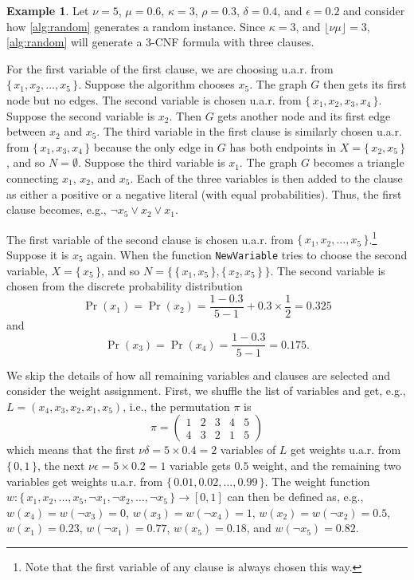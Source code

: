 \documentclass{article}
\theoremstyle{definition}
\newtheorem{example}{Example}
\theoremstyle{remark}
\begin{document}
\begin{example} \label{example:algorithm}
  Let $\nu = 5$, $\mu = 0.6$, $\kappa = 3$, $\rho = 0.3$, $\delta = 0.4$,
  and $\epsilon = 0.2$ and consider how \cref{alg:random} generates a random
  instance. Since $\kappa = 3$, and $\lfloor\nu\mu\rfloor = 3$,
  \cref{alg:random} will generate a 3-CNF formula with three clauses.

  For the first variable of the first clause, we are choosing u.a.r. from $\{\,
  x_1, x_2, \dots, x_5 \,\}$. Suppose the algorithm chooses $x_5$. The graph $G$
  then gets its first node but no edges. The second variable is chosen u.a.r.
  from $\{\, x_1, x_2, x_3, x_4 \,\}$. Suppose the second variable is $x_2$.
  Then $G$ gets another node and its first edge between $x_2$ and $x_5$. The
  third variable in the first clause is similarly chosen u.a.r. from $\{\, x_1,
  x_3, x_4 \,\}$ because the only edge in $G$ has both endpoints in $X = \{\,
  x_2, x_5 \,\}$, and so $N = \emptyset$. Suppose the third variable is $x_1$.
  The graph $G$ becomes a triangle connecting $x_1$, $x_2$, and $x_5$. Each of
  the three variables is then added to the clause as either a positive or a
  negative literal (with equal probabilities). Thus, the first clause becomes,
  e.g., $\neg x_5 \lor x_2 \lor x_1$.

  The first variable of the second clause is chosen u.a.r. from $\{\, x_1, x_2,
  \dots, x_5\,\}$.\footnote{Note that the first variable of any clause is always
    chosen this way.} Suppose it is $x_5$ again. When the function
  \texttt{NewVariable} tries to choose the second variable, $X = \{\, x_5 \,\}$,
  and so $N = \{\, \{\, x_1, x_5 \,\}, \{\, x_2, x_5 \,\}\,\}$. The second
  variable is chosen from the discrete probability distribution
  \[
    \Pr(x_1) = \Pr(x_2) = \frac{1 - 0.3}{5 - 1} + 0.3 \times \frac{1}{2} = 0.325
  \]
  and
  \[
    \Pr(x_3) = \Pr(x_4) = \frac{1 - 0.3}{5 - 1} = 0.175.
  \]

  We skip the details of how all remaining variables and clauses are selected
  and consider the weight assignment. First, we shuffle the list of variables
  and get, e.g., $L = (x_4, x_3, x_2, x_1, x_5)$, i.e., the permutation $\pi$ is
  \[
    \pi =
    \begin{pmatrix}
      1 & 2 & 3 & 4 & 5\\
      4 & 3 & 2 & 1 & 5
    \end{pmatrix}
  \]
  which means that the first $\nu\delta = 5 \times 0.4 = 2$ variables of $L$ get
  weights u.a.r. from $\{\, 0, 1 \,\}$, the next $\nu\epsilon = 5 \times 0.2 =
  1$ variable gets $0.5$ weight, and the remaining two variables get weights
  u.a.r. from $\{\,0.01, 0.02, \dots, 0.99 \,\}$. The weight function $w\colon
  \{\, x_1, x_2, \dots, x_5, \neg x_1, \neg x_2, \dots, \neg x_5\,\} \to [0, 1]$
  can then be defined as, e.g., $w(x_4) = w(\neg x_3) = 0$, $w(x_3) = w(\neg
  x_4) = 1$, $w(x_2) = w(\neg x_2) = 0.5$, $w(x_1) = 0.23$, $w(\neg x_1) =
  0.77$, $w(x_5) = 0.18$, and $w(\neg x_5) = 0.82$.
\end{example}
\end{document}
